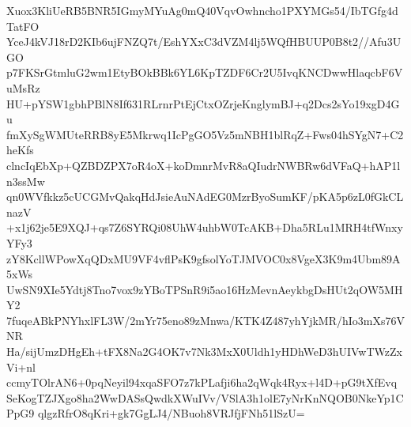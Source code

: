 Xuox3KliUeRB5BNR5IGmyMYuAg0mQ40VqvOwhncho1PXYMGs54/IbTGfg4dTatFO
YceJ4kVJ18rD2KIb6ujFNZQ7t/EshYXxC3dVZM4lj5WQfHBUUP0B8t2//Afu3UGO
p7FKSrGtmluG2wm1EtyBOkBBk6YL6KpTZDF6Cr2U5IvqKNCDwwHlaqcbF6VuMsRz
HU+pYSW1gbhPBlN8If631RLrnrPtEjCtxOZrjeKnglymBJ+q2Dcs2sYo19xgD4Gu
fmXySgWMUteRRB8yE5Mkrwq1IcPgGO5Vz5mNBH1blRqZ+Fws04hSYgN7+C2heKfs
clncIqEbXp+QZBDZPX7oR4oX+koDmnrMvR8aQIudrNWBRw6dVFaQ+hAP1ln3ssMw
qn0WVfkkz5cUCGMvQakqHdJsieAuNAdEG0MzrByoSumKF/pKA5p6zL0fGkCLnazV
+x1j62je5E9XQJ+qs7Z6SYRQi08UhW4uhbW0TcAKB+Dha5RLu1MRH4tfWnxyYFy3
zY8KcllWPowXqQDxMU9VF4vflPsK9gfsolYoTJMVOC0x8VgeX3K9m4Ubm89A5xWs
UwSN9XIe5Ydtj8Tno7vox9zYBoTPSnR9i5ao16HzMevnAeykbgDsHUt2qOW5MHY2
7fuqeABkPNYhxlFL3W/2mYr75eno89zMnwa/KTK4Z487yhYjkMR/hIo3mXs76VNR
Ha/sijUmzDHgEh+tFX8Na2G4OK7v7Nk3MxX0Uldh1yHDhWeD3hUIVwTWzZxVi+nl
ccmyTOlrAN6+0pqNeyil94xqaSFO7z7kPLafji6ha2qWqk4Ryx+l4D+pG9tXfEvq
SeKogTZJXgo8ha2WwDASsQwdkXWuIVv/VSlA3h1olE7yNrKnNQOB0NkeYp1CPpG9
qlgzRfrO8qKri+gk7GgLJ4/NBuoh8VRJfjFNh51lSzU=
